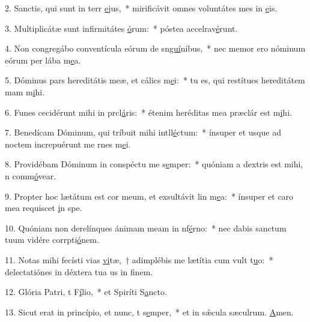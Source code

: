 2. Sanctis, qui sunt in terr \uline{e}jus,~* mirificávit omnes voluntátes mes in \uline{e}is.\par 
3. Multiplicátæ sunt infirmitátes \uline{ó}rum:~* póstea accelrav\uline{é}runt.\par 
4. Non congregábo conventícula eórum de sn\uline{guí}nibus,~* nec memor ero nóminum eórum per lába m\uline{e}a.\par 
5. Dóminus pars hereditátis meæ, et cálics m\uline{e}i:~* tu es, qui restítues hereditátem mam m\uline{i}hi.\par 
6. Funes cecidérunt mihi in prcl\uline{á}ris:~* étenim heréditas mea præclár est m\uline{i}hi.\par 
7. Benedícam Dóminum, qui tríbuit mihi intll\uline{é}ctum:~* ínsuper et usque ad noctem increpuérunt me rnes m\uline{e}i.\par 
8. Providébam Dóminum in conspéctu me s\uline{e}mper:~* quóniam a dextris est mihi, n comm\uline{ó}vear.\par 
9. Propter hoc lætátum est cor meum, et exsultávit lin m\uline{e}a:~* ínsuper et caro mea requiscet \uline{i}n spe.\par 
10. Quóniam non derelínques ánimam meam in nf\uline{é}rno:~* nec dabis sanctum tuum vidére corrpti\uline{ó}nem.\par 
11. Notas mihi fecísti vias \uline{vi}tæ,~† adimplébis me lætítia cum vult t\uline{u}o:~* delectatiónes in déxtera tua us in f\uline{i}nem.\par 
12. Glória Patri, t F\uline{í}lio,~* et Spiríti S\uline{a}ncto.\par 
13. Sicut erat in princípio, et nunc, t s\uline{e}mper,~* et in sǽcula sæculrum. \uline{A}men.\par 
